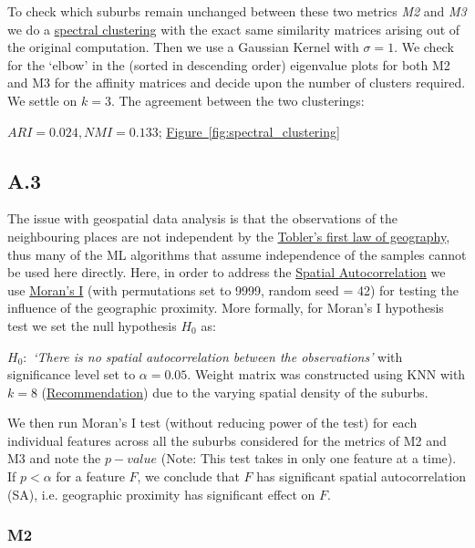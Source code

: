 \documentclass[
	a4paper, %
	10pt, %
	unnumberedsections, %
	twoside, %
]{LTJournalArticle}
\begin{document}
To check which suburbs remain unchanged between these two metrics \textit{M2} and \textit{M3} we do a \href{https://en.wikipedia.org/wiki/Spectral_clustering}{spectral clustering} with the exact same similarity matrices arising out of the original computation. Then we use a Gaussian Kernel with $\sigma=1$. We check for the `elbow' in the (sorted in descending order) eigenvalue plots for both M2 and M3 for the affinity matrices and decide upon the number of clusters required. We settle on $k=3$. The agreement between the two clusterings:

$ARI=0.024, NMI=0.133$;  \hyperref[sub@fig:spectral_clustering]{Figure~\ref{fig:spectral_clustering}}


\subsection{A.3}


The issue with geospatial data analysis is that the observations of the neighbouring places are not independent by the \href{https://en.wikipedia.org/wiki/Tobler%27s_first_law_of_geography}{Tobler's first law of geography}, thus many of the ML algorithms that assume independence of the samples cannot be used here directly. Here, in order to address the \href{https://www.sciencedirect.com/topics/mathematics/spatial-autocorrelation}{Spatial Autocorrelation} we use \href{https://en.wikipedia.org/wiki/Moran%27s_I}{Moran's I} (with permutations set to 9999, random seed = 42) for testing the influence of the geographic proximity. More formally, for Moran's I hypothesis test we set the null hypothesis $H_0$ as:

$H_0:$ \textit{`There is no spatial autocorrelation between the observations'} with significance level set to $\alpha =0.05$. Weight matrix was constructed using KNN with $k=8$ (\href{https://pro.arcgis.com/en/pro-app/latest/tool-reference/spatial-statistics/h-how-spatial-autocorrelation-moran-s-i-spatial-st.htm}{Recommendation}) due to the varying spatial density of the suburbs.

We then run Moran's I test (without reducing power of the test) for each individual features across all the suburbs considered for the metrics of M2 and M3 and note the $p-value$ (Note: This test takes in only one feature at a time). If $p<\alpha$ for a feature $F$, we conclude that $F$ has significant spatial autocorrelation (SA), i.e. geographic proximity has significant effect on $F$.

\subsubsection{M2}\leavevmode
\end{document}
